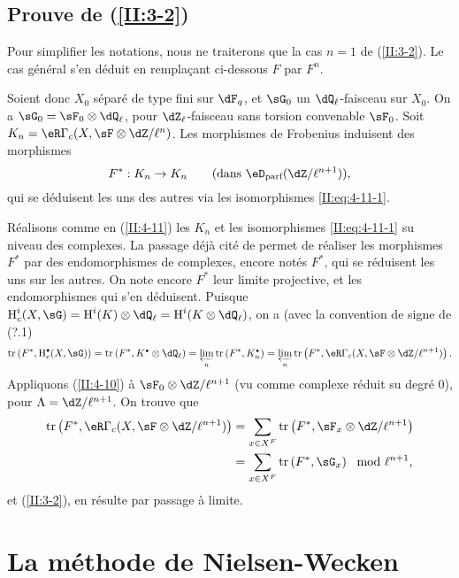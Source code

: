 \subsection{Prouve de \texorpdfstring{(\ref{II:3-2})}{(3.2)}}\label{II:4-13}

Pour simplifier les notations, nous ne traiterons que la cas $n=1$ de 
(\ref{II:3-2}). Le cas général s'en déduit en remplaçant ci-dessous 
$F$ par $F^n$. 

Soient donc $X_0$ séparé de type fini sur $\dF_q$, et $\sG_0$ un 
$\dQ_\ell$-faisceau sur $X_0$. On a $\sG_0=\sF_0\otimes\dQ_\ell$, pour 
$\dZ_\ell$-faisceau sans torsion convenable $\sF_0$. Soit 
$K_n=\eR\Gamma_c(X,\sF\otimes\dZ/\ell^n)$. Les morphismes de Frobenius induisent 
des morphismes 
\[
  F^* : K_n\to K_n \qquad \text{(dans $\eD_\text{parf}(\dZ/\ell^{n+1})$),}
\]
qui se déduisent les uns des autres via les isomorphismes 
\eqref{II:eq:4-11-1}. 

Réalisons comme en (\ref{II:4-11}) les $K_n$ et les isomorphismes 
\eqref{II:eq:4-11-1} su niveau des complexes. La passage déjà cité de 
\cite[XV.3.3]{sga5} permet de réaliser les morphismes $F^*$ par des 
endomorphismes de complexes, encore notés $F^*$, qui se réduisent les uns 
sur les autres. On note encore $F^*$ leur limite projective, et les 
endomorphismes qui s'en déduisent. Puisque 
$\h_c^i(X,\sG) = \h^i(K)\otimes\dQ_\ell = \h^i(K\otimes\dQ_\ell)$, on a (avec 
la convention de signe de (?.1) 
\[
  \tr\left(F^*, \h_c^\bullet(X,\sG)\right) = \tr\left(F^*,K^\bullet\otimes\dQ_\ell\right) = \varprojlim_n \tr\left(F^*,K_n^\bullet\right) = \varprojlim_n \tr\left(F^*,\eR\Gamma_c(X,\sF\otimes\dZ/\ell^{n+1})\right) \text{.}
\]
Appliquons (\ref{II:4-10}) à $\sF_0\otimes\dZ/\ell^{n+1}$ (vu comme complexe 
réduit su degré $0$), pour $\Lambda=\dZ/\ell^{n+1}$. On trouve que 
\begin{align*}
  \tr\left(F^*,\eR\Gamma_c(X,\sF\otimes\dZ/\ell^{n+1})\right) 
    &= \sum_{x\in X^F} \tr\left(F^*,\sF_x\otimes\dZ/\ell^{n+1}\right) \\
    &= \sum_{x\in X^F} \tr\left(F^*,\sG_x\right) \mod \ell^{n+1} \text{,}
\end{align*}
et (\ref{II:3-2}), en résulte par passage à limite. 










\section{La méthode de Nielsen-Wecken}\label{II:5}

